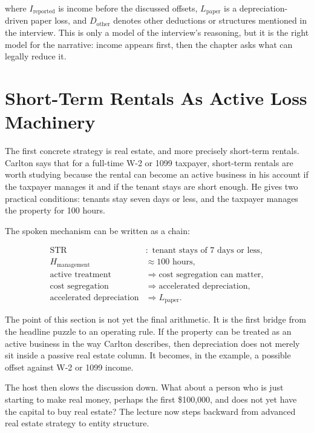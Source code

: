 where \(I_{\mathrm{reported}}\) is income before the discussed offsets, \(L_{\mathrm{paper}}\) is a depreciation-driven paper loss, and \(D_{\mathrm{other}}\) denotes other deductions or structures mentioned in the interview. This is only a model of the interview's reasoning, but it is the right model for the narrative: income appears first, then the chapter asks what can legally reduce it.

\section{Short-Term Rentals As Active Loss Machinery}

The first concrete strategy is real estate, and more precisely short-term rentals. Carlton says that for a full-time W-2 or 1099 taxpayer, short-term rentals are worth studying because the rental can become an active business in his account if the taxpayer manages it and if the tenant stays are short enough. He gives two practical conditions: tenants stay seven days or less, and the taxpayer manages the property for 100 hours.

The spoken mechanism can be written as a chain:

\begin{align}
\mathrm{STR} &: \text{ tenant stays of }7\text{ days or less},\\
H_{\mathrm{management}} &\approx 100\text{ hours},\\
\text{active treatment} &\Longrightarrow \text{cost segregation can matter},\\
\text{cost segregation} &\Longrightarrow \text{accelerated depreciation},\\
\text{accelerated depreciation} &\Longrightarrow L_{\mathrm{paper}}.
\end{align}

The point of this section is not yet the final arithmetic. It is the first bridge from the headline puzzle to an operating rule. If the property can be treated as an active business in the way Carlton describes, then depreciation does not merely sit inside a passive real estate column. It becomes, in the example, a possible offset against W-2 or 1099 income.

The host then slows the discussion down. What about a person who is just starting to make real money, perhaps the first \$100,000, and does not yet have the capital to buy real estate? The lecture now steps backward from advanced real estate strategy to entity structure.

